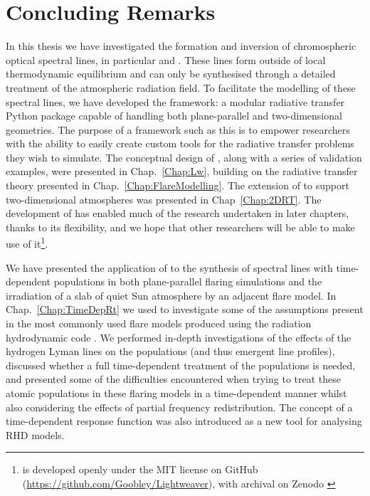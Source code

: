 \chapter{Concluding Remarks}

In this thesis we have investigated the formation and inversion of chromospheric optical spectral lines, in particular \Ha{} and \CaLine{}.
These lines form outside of local thermodynamic equilibrium and can only be synthesised through a detailed treatment of the atmospheric radiation field.
To facilitate the modelling of these spectral lines, we have developed the \Lw{} framework: a modular radiative transfer Python package capable of handling both plane-parallel and two-dimensional geometries.
The purpose of a framework such as this is to empower researchers with the ability to easily create custom tools for the radiative transfer problems they wish to simulate.
The conceptual design of \Lw{}, along with a series of validation examples, were presented in Chap.~\ref{Chap:Lw}, building on the radiative transfer theory presented in Chap.~\ref{Chap:FlareModelling}.
The extension of \Lw{} to support two-dimensional atmospheres was presented in Chap~\ref{Chap:2DRT}.
The development of \Lw{} has enabled much of the research undertaken in later chapters, thanks to its flexibility, and we hope that other researchers will be able to make use of it\footnote{\Lw{} \citep{Osborne2021} is developed openly under the MIT license on GitHub (\url{https://github.com/Goobley/Lightweaver}), with archival on Zenodo \citep{LightweaverZenodo}}.

We have presented the application of \Lw{} to the synthesis of spectral lines with time-dependent populations in both plane-parallel flaring simulations and the irradiation of a slab of quiet Sun atmosphere by an adjacent flare model.
In Chap.~\ref{Chap:TimeDepRt} we used \Lw{} to investigate some of the assumptions present in the most commonly used flare models produced using the \Sota{} radiation hydrodynamic code \Radyn{}.
We performed in-depth investigations of the effects of the hydrogen Lyman lines on the \Caii{} populations (and thus emergent line profiles), discussed whether a full time-dependent treatment of the \Caii{} populations is needed, and presented some of the difficulties encountered when trying to treat these atomic populations in these flaring models in a time-dependent manner whilst also considering the effects of partial frequency redistribution.
The concept of a time-dependent response function was also introduced as a new tool for analysing RHD models.


